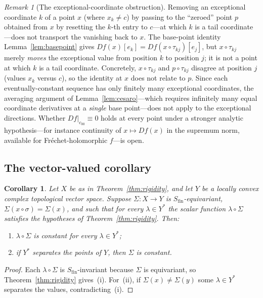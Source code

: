 \documentclass[11pt]{amsart}
\newcommand{\Sfin}{S_{\mathrm{fin}}}
\newcommand{\cc}{c_{00}}
\theoremstyle{plain}
\newtheorem{corollary}[theorem]{Corollary}
\theoremstyle{definition}
\theoremstyle{remark}
\newtheorem{remark}[theorem]{Remark}
\begin{document}
\begin{remark}[The exceptional-coordinate obstruction]
\label{rem:obstruction}
Removing an exceptional coordinate $k$ of a point $x$ (where $x_k\ne c$) by
passing to the ``zeroed'' point $p$ obtained from $x$ by resetting the
$k$-th entry to $c$---at which $k$ is a tail coordinate---does not transport
the vanishing back to $x$. The base-point identity Lemma~\ref{lem:basepoint}
gives $Df(x)[e_k]=Df(x\circ\tau_{kj})[e_j]$, but $x\circ\tau_{kj}$ merely
\emph{moves} the exceptional value from position $k$ to position $j$; it is
not a point at which $k$ is a tail coordinate. Concretely, $x\circ\tau_{kj}$
and $p\circ\tau_{kj}$ disagree at position $j$ (values $x_k$ versus $c$), so
the identity at $x$ does not relate to $p$. Since each eventually-constant
sequence has only finitely many exceptional coordinates, the averaging
argument of Lemma~\ref{lem:cesaro}---which requires infinitely many equal
coordinate derivatives at a \emph{single} base point---does not apply to the
exceptional directions. Whether $Df|_{\cc}\equiv0$ holds at every point
under a stronger analytic hypothesis---for instance continuity of
$x\mapsto Df(x)$ in the supremum norm, available for Fr\'echet-holomorphic
$f$---is open.
\end{remark}

\subsection{The vector-valued corollary}

\begin{corollary}
\label{cor:nosection}
Let $X$ be as in Theorem~\ref{thm:rigidity}, and let $Y$ be a locally
convex complex topological vector space. Suppose $\Sigma:X\to Y$ is
$\Sfin$-equivariant, $\Sigma(x\circ\sigma)=\Sigma(x)$, and such that for
every $\lambda\in Y^*$ the scalar function $\lambda\circ\Sigma$ satisfies
the hypotheses of Theorem~\ref{thm:rigidity}. Then:
\begin{enumerate}[label=\textup{(\roman*)}, leftmargin=2.8em]
\item $\lambda\circ\Sigma$ is constant for every $\lambda\in Y^*$;
\item if $Y^*$ separates the points of $Y$, then $\Sigma$ is constant.
\end{enumerate}
\end{corollary}

\begin{proof}
Each $\lambda\circ\Sigma$ is $\Sfin$-invariant because $\Sigma$ is
equivariant, so Theorem~\ref{thm:rigidity} gives~(i). For~(ii), if
$\Sigma(x)\ne\Sigma(y)$ some $\lambda\in Y^*$ separates the values,
contradicting~(i).
\end{proof}
\end{document}
